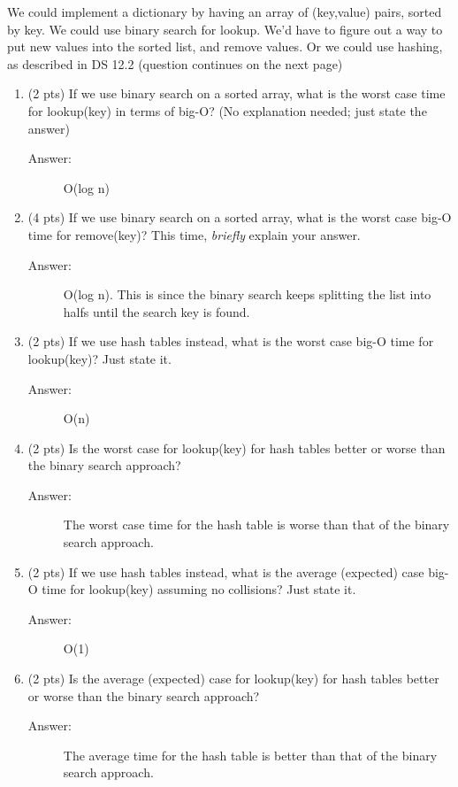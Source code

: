 \documentclass[11pt]{article}
\begin{document}
 We could implement a dictionary by having an array of (key,value) pairs,
sorted by key. We could use binary search for lookup. We'd have to figure out a
way to put new values into the sorted list, and remove values. Or we could use
hashing, as described in DS 12.2
(question continues on the next page)

\begin{enumerate}
\item (2 pts) If we use binary search on a sorted array, what is the worst case
time for lookup(key) in terms of big-O? (No explanation needed; just state
the answer)
\begin{description}
    \item[Answer:] O(log n)
\end{description}
\item (4 pts) If we use binary search on a sorted array, what is the worst case
big-O time for remove(key)? This time, \emph{briefly} explain your
answer.
\begin{description}
    \item[Answer:] O(log n). This is since the binary search keeps splitting the list into halfs until the search key is found.
\end{description}
\item (2 pts) If we use hash tables instead, what is the worst case big-O time
for lookup(key)? Just state it.
\begin{description}
    \item[Answer:] O(n)
\end{description}
\item (2 pts) Is the worst case for lookup(key) for hash tables better or worse
than the binary search approach?
\begin{description}
    \item[Answer:] The worst case time for the hash table is worse than that of the binary search approach.
\end{description}
\item (2 pts) If we use hash tables instead, what is the average (expected) case
big-O time for lookup(key) assuming no collisions? Just state it.
\begin{description}
    \item[Answer:] O(1)
\end{description}
\item (2 pts) Is the average (expected) case for lookup(key) for hash tables
better or worse than the binary search approach?
\begin{description}
    \item[Answer:] The average time for the hash table is better than that of the binary search approach.
\end{description}
\end{enumerate}
\end{document}
